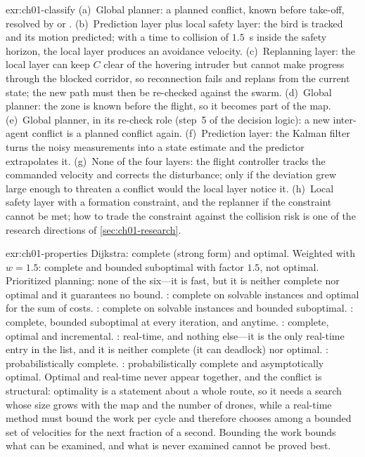 
\begin{solution}{exr:ch01-classify}
(a)~Global planner: a planned conflict, known before take-off, resolved by \cbs or
\ecbs. (b)~Prediction layer plus local safety layer: the bird is tracked and its
motion predicted; with a time to collision of $1.5$~s inside the safety horizon, the
local layer produces an avoidance velocity. (c)~Replanning layer: the local layer can
keep $C$ clear of the hovering intruder but cannot make progress through the blocked
corridor, so reconnection fails and \dstarlite replans from the current state; the
new path must then be re-checked against the swarm. (d)~Global planner: the zone is
known before the flight, so it becomes part of the map. (e)~Global planner, in its
re-check role (step~5 of the decision logic): a new inter-agent conflict is a planned
conflict again. (f)~Prediction layer: the Kalman filter turns the noisy measurements
into a state estimate and the predictor extrapolates it. (g)~None of the four layers:
the flight controller tracks the commanded velocity and corrects the disturbance; only
if the deviation grew large enough to threaten a conflict would the local layer
notice it. (h)~Local safety layer with a formation constraint, and the replanner if the
constraint cannot be met; how to trade the constraint against the collision risk is
one of the research directions of \cref{sec:ch01-research}.
\end{solution}

\begin{solution}{exr:ch01-properties}
Dijkstra: complete (strong form) and optimal. Weighted \astar with $w=1.5$: complete
and bounded suboptimal with factor $1.5$, not optimal. Prioritized planning: none of
the six---it is fast, but it is neither complete nor optimal and it guarantees no
bound. \cbs: complete on solvable instances and optimal for the sum of costs.
\ecbs: complete on solvable instances and bounded suboptimal. \arastar: complete,
bounded suboptimal at every iteration, and anytime. \dstarlite: complete, optimal
and incremental. \orca: real-time, and nothing else---it is the only real-time entry
in the list, and it is neither complete (it can deadlock) nor optimal. \rrt:
probabilistically complete. \rrtstar: probabilistically complete and asymptotically
optimal. Optimal and real-time never appear together, and the conflict is structural:
optimality is a statement about a whole route, so it needs a search whose size grows
with the map and the number of drones, while a real-time method must bound the work
per cycle and therefore chooses among a bounded set of velocities for the next
fraction of a second. Bounding the work bounds what can be examined, and what is
never examined cannot be proved best.
\end{solution}

